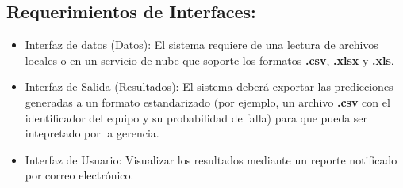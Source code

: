 \documentclass[12pt,a4paper]{article}
\begin{document}
        \subsection{\textbf{Requerimientos de Interfaces:}}
                    \begin{itemize}
                        \item Interfaz de datos (Datos): El sistema requiere de una lectura de archivos locales o en un servicio de nube que soporte los formatos \textbf{.csv}, \textbf{.xlsx} y \textbf{.xls}.
                        \item Interfaz de Salida (Resultados): El sistema deberá exportar las predicciones generadas a un formato estandarizado (por ejemplo, un archivo \textbf{.csv} con el identificador del equipo y su probabilidad de falla) para que pueda ser intepretado por la gerencia.
                        \item Interfaz de Usuario: Visualizar los resultados mediante un reporte notificado por correo electrónico.
                    \end{itemize}
\end{document}
